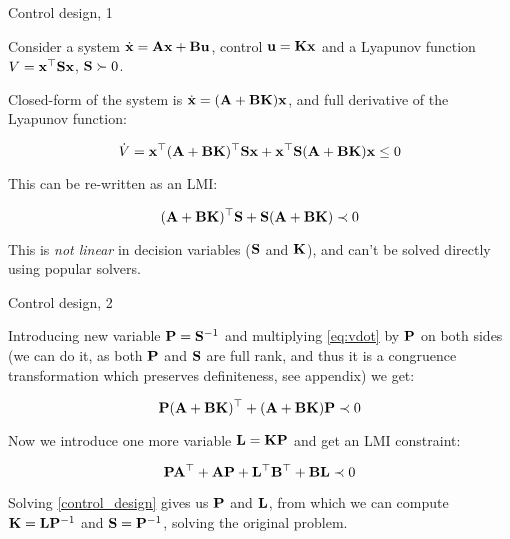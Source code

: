 \documentclass{beamer}
\begin{document}
	\begin{frame}{Control design, 1}
		\begin{flushleft}
			
			Consider a system $\dot{\mathbf{x}} = \mathbf{A}\mathbf{x} + \mathbf{B}\mathbf{u}$, control $\mathbf{u} = \mathbf{K}\mathbf{x}$ and a Lyapunov function $V = \mathbf{x}^\top\mathbf{S}\mathbf{x}$, $\mathbf{S} \succ 0$.
			
			\bigskip
			
			Closed-form of the system is $\dot{\mathbf{x}} = (\mathbf{A} + \mathbf{B}\mathbf{K})\mathbf{x}$, and full derivative of the Lyapunov function:
			
			\begin{equation}
				\dot V = \mathbf{x}^\top (\mathbf{A} + \mathbf{B}\mathbf{K})^\top\mathbf{S}\mathbf{x} + \mathbf{x}^\top\mathbf{S} (\mathbf{A} + \mathbf{B}\mathbf{K}) \mathbf{x} \leq 0
			\end{equation}
			
			This can be re-written as an LMI:
			
			\begin{equation}
				\label{eq:vdot}
				(\mathbf{A} + \mathbf{B}\mathbf{K})^\top\mathbf{S} + \mathbf{S} (\mathbf{A} + \mathbf{B}\mathbf{K}) \prec 0
			\end{equation}
			
			This is \emph{not linear} in decision variables ($\mathbf{S}$ and $\mathbf{K}$), and can't be solved directly using popular solvers.
			
		\end{flushleft}
	\end{frame}
	
	
	
	
	\begin{frame}{Control design, 2}
		\begin{flushleft}
			
			Introducing new variable $\mathbf{P} = \mathbf{S}^{-1}$ and multiplying \eqref{eq:vdot} by $\mathbf{P}$ on both sides (we can do it, as both $\mathbf{P}$ and $\mathbf{S}$ are full rank, and thus it is a congruence transformation which preserves definiteness, see appendix) we get:
			
			\begin{equation}
				\mathbf{P}(\mathbf{A} + \mathbf{B}\mathbf{K})^\top + (\mathbf{A} + \mathbf{B}\mathbf{K})\mathbf{P} \prec 0
			\end{equation}
			
			Now we introduce one more variable $\mathbf{L} = \mathbf{K}\mathbf{P}$ and get an LMI constraint:
			
			\begin{equation}
				\label{control_design}
				\mathbf{P}\mathbf{A}^\top + \mathbf{A}\mathbf{P} + \mathbf{L}^\top\mathbf{B}^\top + \mathbf{B}\mathbf{L} \prec 0
			\end{equation}
			
			Solving \eqref{control_design} gives us $\mathbf{P}$ and $\mathbf{L}$, from which we can compute $\mathbf{K} = \mathbf{L}\mathbf{P}^{-1}$ and $\mathbf{S} = \mathbf{P}^{-1}$, solving the original problem.
			
		\end{flushleft}
	\end{frame}
	
\end{document}
